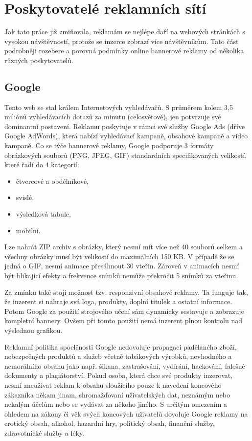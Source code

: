 \section{Poskytovatelé reklamních sítí}
\label{sec:networks}
Jak tato práce již zmiňovala, reklamám se nejlépe daří na webových stránkách s vysokou návštěvností, protože se inzerce zobrazí více návštěvníkům.
Tato část podrobněji rozebere a porovná podmínky online bannerové reklamy od několika různých poskytovatelů. 

    \subsection{Google}
    Tento web se stal králem Internetových vyhledávačů. S průměrem kolem 3,5 miliónů vyhledávacích dotazů za minutu (celosvětově),
    jen potvrzuje své dominantní postavení. Reklamu poskytuje v rámci své služby Google Ads (dříve Google AdWords),
    která nabízí vyhledávací kampaně, obsahové kampaně a video kampaně. Co se týče bannerové reklamy,
    Google podporuje 3 formáty obrázkových souborů (PNG, JPEG, GIF) standardních specifikovaných velikostí, které řadí do 4 kategorií:
    \begin{itemize}
        \item čtvercové a obdélníkové,
        \item svislé,
        \item výsledková tabule,
        \item mobilní.
    \end{itemize}

    Lze nahrát ZIP archiv s obrázky, který nesmí mít více než 40 souborů celkem a všechny obrázky musí být velikostí do maximálních 150 KB. V případě že se jedná o GIF,
    nesmí animace přesáhnout 30 vteřin. Zároveň v animacích nesmí být blikající efekty a frekvence snímků nemůže překročit 5 snímků za vteřinu.

    Za zmínku také stojí možnost tzv. responzivní obsahové reklamy. Ta funguje tak, že inzerent si nahraje svá loga, produkty,
    doplní titulek a ostatní informace. Potom Google za použití strojového učení sám dynamicky sestavuje a zobrazuje kompletní bannery.
    Ovšem při tomto použití nemá inzerent plnou kontrolu nad výslednou grafikou.

    Reklamní politika spoelčnosti Google nedovoluje propagaci padělaného zboží, nebezpečných produktů a služeb včetně tabákových výrobků,
    nevhodného a nemorálního obsahu jako např. šikana, zastrašování, vydírání, hackování, falešné dokumenty a plagiátorství. Pokud osoba,
    která chce své produkty inzerovat, nesmí zneužívat reklam k obsahu sloužícího pouze k navedení koncového zákazníka někam jinam,
    shromažďovaní uživatelských dat, neznámým nebo nekalým účelům nebo se vydávat za někoho jiného. S určitým omezením a ohledem na zákony či věk svých koncových
    uživatelů dovoluje Google reklamy na erotický obsah, alkohol, hazardní hry, politický obsah, finanční služby, zdravotnické služby a léky.

